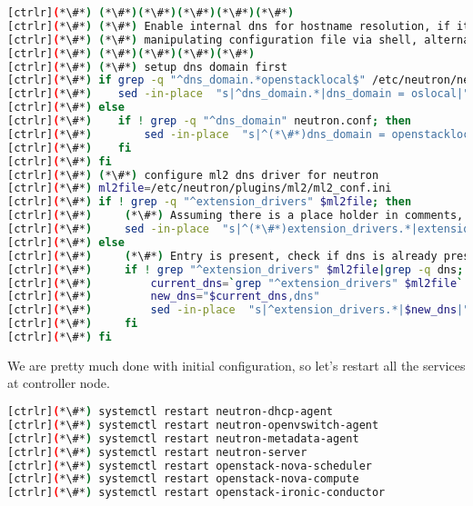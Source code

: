 
\begin{lstlisting}[language=bash,keywords={}]
[ctrlr](*\#*) (*\#*)(*\#*)(*\#*)(*\#*)(*\#*)
[ctrlr](*\#*) (*\#*) Enable internal dns for hostname resolution, if it already not set
[ctrlr](*\#*) (*\#*) manipulating configuration file via shell, alternate is to use openstack-config (TODO)
[ctrlr](*\#*) (*\#*)(*\#*)(*\#*)(*\#*)
[ctrlr](*\#*) (*\#*) setup dns domain first
[ctrlr](*\#*) if grep -q "^dns_domain.*openstacklocal$" /etc/neutron/neutron.conf; then
[ctrlr](*\#*)    sed -in-place  "s|^dns_domain.*|dns_domain = oslocal|" /etc/neutron/neutron.conf
[ctrlr](*\#*) else
[ctrlr](*\#*)    if ! grep -q "^dns_domain" neutron.conf; then
[ctrlr](*\#*)        sed -in-place  "s|^(*\#*)dns_domain = openstacklocal$|dns_domain = oslocal|" /etc/neutron/neutron.conf
[ctrlr](*\#*)    fi
[ctrlr](*\#*) fi
[ctrlr](*\#*) (*\#*) configure ml2 dns driver for neutron
[ctrlr](*\#*) ml2file=/etc/neutron/plugins/ml2/ml2_conf.ini
[ctrlr](*\#*) if ! grep -q "^extension_drivers" $ml2file; then
[ctrlr](*\#*)     (*\#*) Assuming there is a place holder in comments, replace that string
[ctrlr](*\#*)     sed -in-place  "s|^(*\#*)extension_drivers.*|extension_drivers = port_security,dns|" $ml2file
[ctrlr](*\#*) else
[ctrlr](*\#*)     (*\#*) Entry is present, check if dns is already present, if not then enable
[ctrlr](*\#*)     if ! grep "^extension_drivers" $ml2file|grep -q dns; then
[ctrlr](*\#*)         current_dns=`grep "^extension_drivers" $ml2file`
[ctrlr](*\#*)         new_dns="$current_dns,dns"
[ctrlr](*\#*)         sed -in-place  "s|^extension_drivers.*|$new_dns|" $ml2file
[ctrlr](*\#*)     fi
[ctrlr](*\#*) fi
\end{lstlisting} 

We are pretty much done with initial configuration, so let’s restart all the services at controller node.


\begin{lstlisting}[language=bash,keywords={}]
[ctrlr](*\#*) systemctl restart neutron-dhcp-agent
[ctrlr](*\#*) systemctl restart neutron-openvswitch-agent
[ctrlr](*\#*) systemctl restart neutron-metadata-agent
[ctrlr](*\#*) systemctl restart neutron-server
[ctrlr](*\#*) systemctl restart openstack-nova-scheduler
[ctrlr](*\#*) systemctl restart openstack-nova-compute
[ctrlr](*\#*) systemctl restart openstack-ironic-conductor
\end{lstlisting} 

